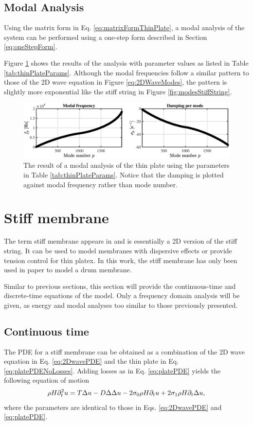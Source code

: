 {\subsection{Modal Analysis}
Using the matrix form in Eq. \eqref{eq:matrixFormThinPlate}, a modal analysis of the system can be performed using a one-step form described in Section \ref{eq:oneStepForm}.

Figure \ref{fig:thinPlateModes} shows the results of the analysis with parameter values as listed in Table \ref{tab:thinPlateParams}. Although the modal frequencies follow a similar pattern to those of the 2D wave equation in Figure \ref{eq:2DWaveModes}, the pattern is slightly more exponential like the stiff string in Figure \ref{fig:modesStiffString}. 

\begin{figure}[h]
    \centering
    \includegraphics[width=\textwidth]{figures/resonators/2d/thinPlateModes.eps}
    \caption{The result of a modal analysis of the thin plate using the parameters in Table \ref{tab:thinPlateParams}. Notice that the damping is plotted against modal frequency rather than mode number. \label{fig:thinPlateModes}}
\end{figure}

\section{Stiff membrane}
The term stiff membrane appears in \cite{Fletcher1998} and is essentially a 2D version of the stiff string. It can be used to model membranes with dispersive effects or provide tension control for thin platex. In this work, the stiff membrane has only been used in paper \citeP[F] to model a drum membrane. 

Similar to previous sections, this section will provide the continuous-time and discrete-time equations of the model. Only a frequency domain analysis will be given, as energy and modal analyses too similar to those previously presented.

\subsection{Continuous time}
The PDE for a stiff membrane can be obtained as a combination of the 2D wave equation in Eq. \eqref{eq:2DwavePDE} and the thin plate in Eq. \eqref{eq:platePDENoLosses}. Adding losses as in Eq. \eqref{eq:platePDE} yields the following equation of motion
\begin{equation}\label{eq:stiffMembranePDE}
    \rho H \partial_t^2 u = T\Delta u - D
    \Delta\Delta u- 2\sigma_{0} \rho H \partial_t u + 2 \sigma_{1}\rho H  \partial_t \Delta u,
\end{equation}
where the parameters are identical to those in Eqs. \eqref{eq:2DwavePDE} and \eqref{eq:platePDE}.


}
